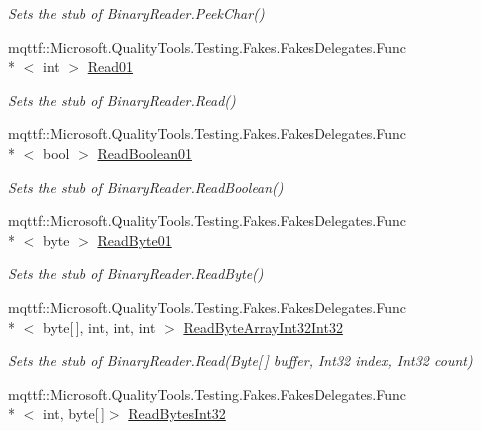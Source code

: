 \begin{DoxyCompactItemize}
\begin{DoxyCompactList}\small\item\em Sets the stub of Binary\-Reader.\-Peek\-Char()\end{DoxyCompactList}\item 
mqttf\-::\-Microsoft.\-Quality\-Tools.\-Testing.\-Fakes.\-Fakes\-Delegates.\-Func\\*
$<$ int $>$ \hyperlink{class_system_1_1_i_o_1_1_fakes_1_1_stub_binary_reader_a81199b01e01509cdb4ed9f45d5375153}{Read01}
\begin{DoxyCompactList}\small\item\em Sets the stub of Binary\-Reader.\-Read()\end{DoxyCompactList}\item 
mqttf\-::\-Microsoft.\-Quality\-Tools.\-Testing.\-Fakes.\-Fakes\-Delegates.\-Func\\*
$<$ bool $>$ \hyperlink{class_system_1_1_i_o_1_1_fakes_1_1_stub_binary_reader_ac9a971de8f7e9e473730d879e316a72c}{Read\-Boolean01}
\begin{DoxyCompactList}\small\item\em Sets the stub of Binary\-Reader.\-Read\-Boolean()\end{DoxyCompactList}\item 
mqttf\-::\-Microsoft.\-Quality\-Tools.\-Testing.\-Fakes.\-Fakes\-Delegates.\-Func\\*
$<$ byte $>$ \hyperlink{class_system_1_1_i_o_1_1_fakes_1_1_stub_binary_reader_a1556647b5d71ab3d7059ab1e0388e876}{Read\-Byte01}
\begin{DoxyCompactList}\small\item\em Sets the stub of Binary\-Reader.\-Read\-Byte()\end{DoxyCompactList}\item 
mqttf\-::\-Microsoft.\-Quality\-Tools.\-Testing.\-Fakes.\-Fakes\-Delegates.\-Func\\*
$<$ byte\mbox{[}$\,$\mbox{]}, int, int, int $>$ \hyperlink{class_system_1_1_i_o_1_1_fakes_1_1_stub_binary_reader_a509da1f8651f81153729dda4457bece6}{Read\-Byte\-Array\-Int32\-Int32}
\begin{DoxyCompactList}\small\item\em Sets the stub of Binary\-Reader.\-Read(\-Byte\mbox{[}$\,$\mbox{]} buffer, Int32 index, Int32 count)\end{DoxyCompactList}\item 
mqttf\-::\-Microsoft.\-Quality\-Tools.\-Testing.\-Fakes.\-Fakes\-Delegates.\-Func\\*
$<$ int, byte\mbox{[}$\,$\mbox{]}$>$ \hyperlink{class_system_1_1_i_o_1_1_fakes_1_1_stub_binary_reader_aef633547d4502ec36627a7c6be23632b}{Read\-Bytes\-Int32}

\end{DoxyCompactItemize}
